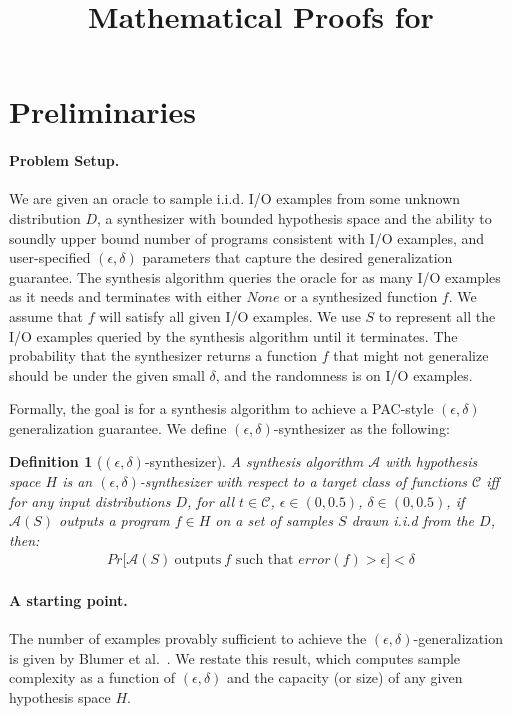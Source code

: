 \documentclass[11pt]{extarticle}
\title{Mathematical Proofs for \tool}
\newtheorem{definition}{Definition}
\newcommand{\distrib}{D}
\newcommand{\synthalgo}{\mathcal{A}(S)}
\newcommand{\etal}{et al.\xspace}
\newcommand{\concept}{\mathcal{C}}
\begin{document}
\maketitle

\section{Preliminaries}

\paragraph{Problem Setup.} We are given an oracle to sample i.i.d. I/O examples from some unknown distribution $\distrib$, a synthesizer with bounded hypothesis space and the ability to soundly upper bound number of programs consistent with I/O examples, and user-specified $(\epsilon,\delta)$ parameters that capture the desired generalization guarantee. The synthesis algorithm queries the oracle for as many I/O examples as it needs and terminates with either $None$ or a synthesized function $f$. We assume that $f$ will satisfy all given I/O examples. We use $S$ to represent all the I/O examples queried by the synthesis algorithm until it terminates. The probability that the synthesizer returns a function $f$ that might not generalize should be under the given small $\delta$, and the randomness is on I/O examples.

Formally, the goal is for a synthesis algorithm to achieve a PAC-style $(\epsilon,\delta)$ generalization guarantee. We define $(\epsilon,\delta)$-synthesizer as the following:

\begin{definition}[$(\epsilon,\delta)$-synthesizer]
\label{def:eps-delta}
  A synthesis algorithm $\mathcal{A}$ with hypothesis space $H$ is an $(\epsilon, \delta)$-synthesizer with respect to a target class of
  functions $\concept$ iff for any input distributions $\distrib$, for all $t
  \in \concept$, $\epsilon \in (0, 0.5)$, $\delta \in (0, 0.5)$, if $\synthalgo$ outputs a program $f \in H$ on a set of samples $S$ drawn i.i.d from the $\distrib$, then:
  \begin{align*}
    Pr\lbrack \synthalgo~\text{outputs}~ f \text{ such that } error(f) > \epsilon \rbrack < \delta
  \end{align*} 

\end{definition}

\paragraph{A starting point.} The number of examples provably sufficient to achieve the $(\epsilon, \delta)$-generalization is given by Blumer \etal~\cite{blumer1987occam}. We restate this result, which computes sample complexity as a function of $(\epsilon,\delta)$ and the capacity (or size) of any given hypothesis space $H$.
\end{document}
